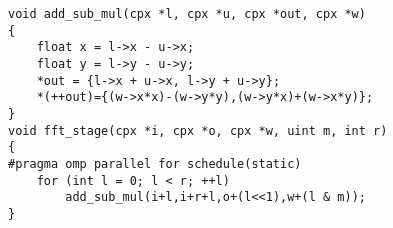 \begin{lstlisting}
void add_sub_mul(cpx *l, cpx *u, cpx *out, cpx *w)
{
    float x = l->x - u->x;
    float y = l->y - u->y;
    *out = {l->x + u->x, l->y + u->y};
    *(++out)={(w->x*x)-(w->y*y),(w->y*x)+(w->x*y)};
}
void fft_stage(cpx *i, cpx *o, cpx *w, uint m, int r)
{
#pragma omp parallel for schedule(static)
    for (int l = 0; l < r; ++l)
        add_sub_mul(i+l,i+r+l,o+(l<<1),w+(l & m));
}
\end{lstlisting}